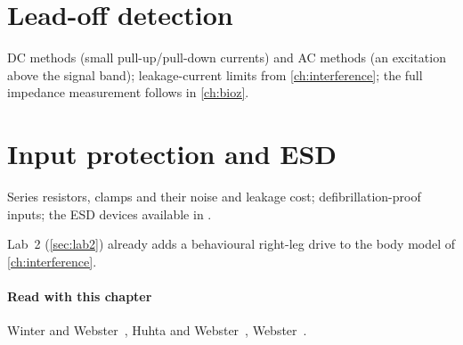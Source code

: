 \section{Lead-off detection}\label{sec:ch12-3}
DC methods (small pull-up/pull-down currents) and AC methods (an excitation above the signal band); leakage-current limits from \cref{ch:interference}; the full impedance measurement follows in \cref{ch:bioz}.

\section{Input protection and ESD}\label{sec:ch12-4}
Series resistors, clamps and their noise and leakage cost; defibrillation-proof inputs; the ESD devices available in \sgx{}.

\begin{tryit}
Lab~2 (\cref{sec:lab2}) already adds a behavioural right-leg drive to the body model of \cref{ch:interference}.
\end{tryit}

\paragraph{Read with this chapter} Winter and Webster~\cite{winter1983}, Huhta and Webster~\cite{huhta1973}, Webster~\cite{webster}.
